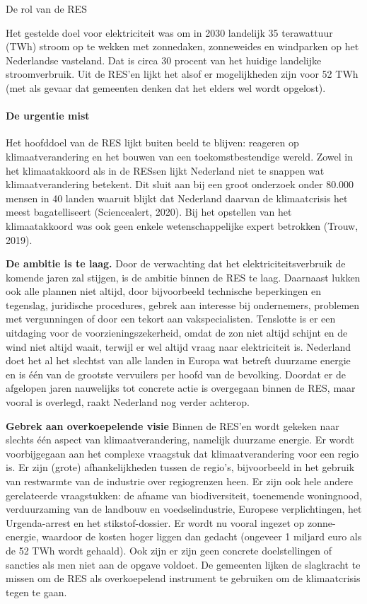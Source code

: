\begin{voorstel}{De rol van de RES}
\begin{multicols*}{2}
\begin{overwegingen}
Het gestelde doel voor elektriciteit was om in 2030 landelijk 35 terawattuur (TWh) stroom op te wekken met zonnedaken, zonneweides en windparken op het Nederlandse vasteland. Dat is circa 30 procent van het huidige landelijke stroomverbruik. Uit de RES’en lijkt het alsof er mogelijkheden zijn voor 52 TWh (met als gevaar dat gemeenten denken dat het elders wel wordt opgelost).


\paragraph{De urgentie mist}
Het hoofddoel van de RES lijkt buiten beeld te blijven: reageren op klimaatverandering en het bouwen van een toekomstbestendige wereld. Zowel in het klimaatakkoord als in de RESsen lijkt Nederland niet te snappen wat klimaatverandering betekent. Dit sluit aan bij een groot onderzoek onder 80.000 mensen in 40 landen waaruit blijkt dat Nederland daarvan de klimaatcrisis het meest bagatelliseert (Sciencealert, 2020). Bij het opstellen van het klimaatakkoord was ook geen enkele wetenschappelijke expert betrokken (Trouw, 2019).

\textbf{De ambitie is te laag.} Door de verwachting dat het elektriciteitsverbruik de komende jaren zal stijgen, is de ambitie binnen de RES te laag. Daarnaast lukken ook alle plannen niet altijd, door bijvoorbeeld technische beperkingen en tegenslag, juridische procedures, gebrek aan interesse bij ondernemers, problemen met vergunningen of door een tekort aan vakspecialisten. Tenslotte is er een uitdaging voor de voorzieningszekerheid, omdat de zon niet altijd schijnt en de wind niet altijd waait, terwijl er wel altijd vraag naar elektriciteit is. Nederland doet het al het slechtst van alle landen in Europa wat betreft duurzame energie en is één van de grootste vervuilers per hoofd van de bevolking. Doordat er de afgelopen jaren nauwelijks tot concrete actie is overgegaan binnen de RES, maar vooral is overlegd, raakt Nederland nog verder achterop.

\textbf{Gebrek aan overkoepelende visie} Binnen de RES’en wordt gekeken naar slechts één aspect van klimaatverandering, namelijk duurzame energie. Er wordt voorbijgegaan aan het complexe vraagstuk dat klimaatverandering voor een regio is. Er zijn (grote) afhankelijkheden tussen de regio’s, bijvoorbeeld in het gebruik van restwarmte van de industrie over regiogrenzen heen. Er zijn ook hele andere gerelateerde vraagstukken: de afname van biodiversiteit, toenemende woningnood, verduurzaming van de landbouw en voedselindustrie, Europese verplichtingen, het Urgenda-arrest en het stikstof-dossier. Er wordt nu vooral ingezet op zonne-energie, waardoor de kosten hoger liggen dan gedacht (ongeveer 1 miljard euro als de 52 TWh wordt gehaald). Ook zijn er zijn geen concrete doelstellingen of sancties als men niet aan de opgave voldoet. De gemeenten lijken de slagkracht te missen om de RES als overkoepelend instrument te gebruiken om de klimaatcrisis tegen te gaan.


\end{overwegingen}
\end{multicols*}
\end{voorstel}
